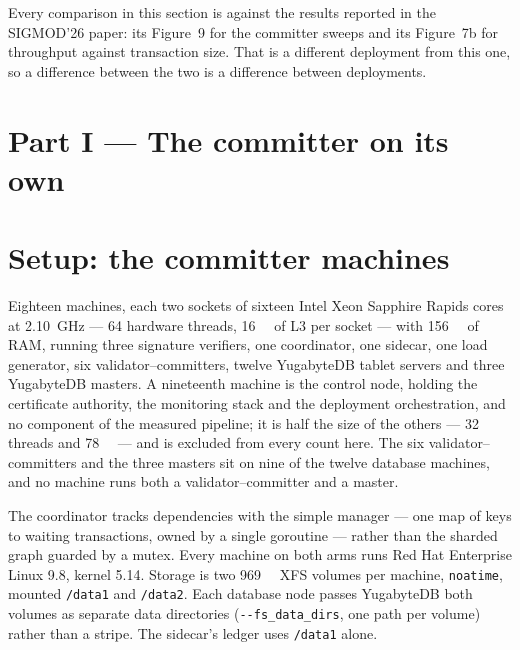 \documentclass[10pt,twocolumn]{article}
\begin{document}

Every comparison in this section is against the results reported in the SIGMOD'26 paper: its
Figure~9 for the committer sweeps and its Figure~7b for throughput against transaction size. That is a
different deployment from this one, so a difference between the two is a difference between
deployments.

\section*{Part I --- The committer on its own}

\section{Setup: the committer machines}

Eighteen machines, each two sockets of sixteen Intel Xeon Sapphire Rapids cores at
\SI{2.10}{\giga\hertz} --- 64 hardware threads, \SI{16}{\mebi\byte} of L3 per socket --- with
\SI{156}{\gibi\byte} of RAM, running three signature verifiers, one
coordinator, one sidecar, one load generator, six validator--committers, twelve YugabyteDB tablet
servers and three YugabyteDB masters. A nineteenth machine is the control node, holding the
certificate authority, the monitoring stack and the deployment orchestration, and no component of
the measured pipeline; it is half the size of the others --- 32 threads and \SI{78}{\gibi\byte} ---
and is excluded from every count here. The six validator--committers and the three masters sit on nine
of the twelve database machines, and no machine runs both a validator--committer and a master.

The coordinator tracks dependencies with the simple manager --- one map of keys to waiting
transactions, owned by a single goroutine --- rather than the sharded graph guarded by a mutex.
Every machine on both arms runs Red Hat Enterprise Linux 9.8, kernel 5.14. Storage is two
\SI{969}{\gibi\byte} XFS volumes per machine, \texttt{noatime}, mounted \texttt{/data1} and
\texttt{/data2}. Each database node passes YugabyteDB both volumes as separate data directories
(\texttt{-{}-fs\_data\_dirs}, one path per volume) rather than a stripe. The sidecar's
ledger uses \texttt{/data1} alone.
\end{document}
